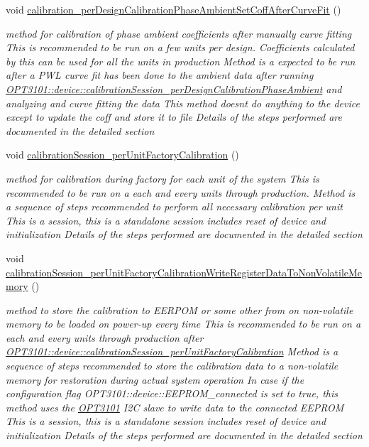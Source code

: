 \begin{DoxyCompactItemize}
void \mbox{\hyperlink{class_o_p_t3101_1_1device_a3b278687f5414b66c614d83dcf229f80}{calibration\+\_\+per\+Design\+Calibration\+Phase\+Ambient\+Set\+Coff\+After\+Curve\+Fit}} ()
\begin{DoxyCompactList}\small\item\em method for calibration of phase ambient coefficients after manually curve fitting This is recommended to be run on a few units per design. Coefficients calculated by this can be used for all the units in production Method is a expected to be run after a P\+WL curve fit has been done to the ambient data after running \mbox{\hyperlink{class_o_p_t3101_1_1device_a94c4e35aa43bc53eb8fe0d4c364aea25}{O\+P\+T3101\+::device\+::calibration\+Session\+\_\+per\+Design\+Calibration\+Phase\+Ambient}} and analyzing and curve fitting the data This method doesn\textquotesingle{}t do anything to the device except to update the coff and store it to file Details of the steps performed are documented in the detailed section \end{DoxyCompactList}\item 
void \mbox{\hyperlink{class_o_p_t3101_1_1device_abad5b2d7405e735fa80041dbbf47502c}{calibration\+Session\+\_\+per\+Unit\+Factory\+Calibration}} ()
\begin{DoxyCompactList}\small\item\em method for calibration during factory for each unit of the system This is recommended to be run on a each and every units through production. Method is a sequence of steps recommended to perform all necessary calibration per unit This is a session, this is a standalone session includes reset of device and initialization Details of the steps performed are documented in the detailed section \end{DoxyCompactList}\item 
void \mbox{\hyperlink{class_o_p_t3101_1_1device_aa0a1b1f37d9aea753d7910de3e8c2799}{calibration\+Session\+\_\+per\+Unit\+Factory\+Calibration\+Write\+Register\+Data\+To\+Non\+Volatile\+Memory}} ()
\begin{DoxyCompactList}\small\item\em method to store the calibration to E\+E\+R\+P\+OM or some other from on non-\/volatile memory to be loaded on power-\/up every time This is recommended to be run on a each and every units through production after \mbox{\hyperlink{class_o_p_t3101_1_1device_abad5b2d7405e735fa80041dbbf47502c}{O\+P\+T3101\+::device\+::calibration\+Session\+\_\+per\+Unit\+Factory\+Calibration}} Method is a sequence of steps recommended to store the calibration data to a non-\/volatile memory for restoration during actual system operation In case if the configuration flag O\+P\+T3101\+::device\+::\+E\+E\+P\+R\+O\+M\+\_\+connected is set to true, this method uses the \mbox{\hyperlink{namespace_o_p_t3101}{O\+P\+T3101}} I2C slave to write data to the connected E\+E\+P\+R\+OM This is a session, this is a standalone session includes reset of device and initialization Details of the steps performed are documented in the detailed section \end{DoxyCompactList}\end{DoxyCompactItemize}
